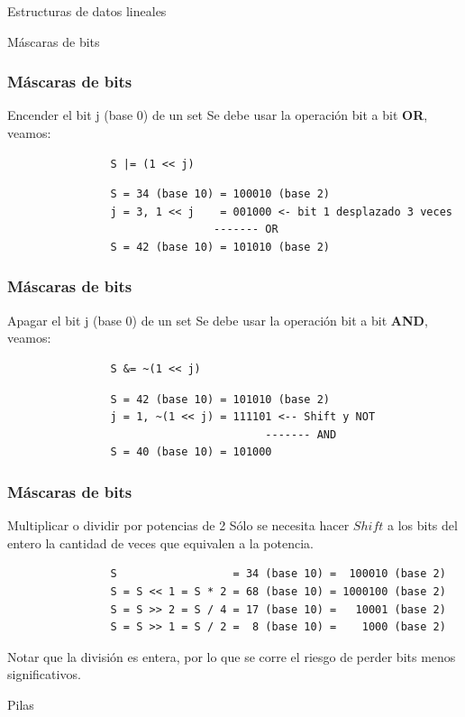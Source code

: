\documentclass{beamer}
\begin{document}
\begin{section}{Estructuras de datos lineales}
\begin{subsection}{Máscaras de bits}
	\begin{frame}[fragile]
		\frametitle{Máscaras de bits}
		\begin{block}{Encender el bit j (base 0) de un set}
			Se debe usar la operación bit a bit \textbf{OR}, veamos:
			\begin{verbatim}
				S |= (1 << j)
			\end{verbatim}
			\begin{lstlisting}
				S = 34 (base 10) = 100010 (base 2)
				j = 3, 1 << j    = 001000 <- bit 1 desplazado 3 veces
                  				------- OR
				S = 42 (base 10) = 101010 (base 2)	
			\end{lstlisting}
		\end{block}		
	\end{frame}
	
	\begin{frame}[fragile]
		\frametitle{Máscaras de bits}
		\begin{block}{Apagar el bit j (base 0) de un set}
			Se debe usar la operación bit a bit \textbf{AND}, veamos:
			\begin{verbatim}
				S &= ~(1 << j)
			\end{verbatim}
			\begin{lstlisting}
				S = 42 (base 10) = 101010 (base 2)
				j = 1, ~(1 << j) = 111101 <-- Shift y NOT
                  						------- AND
				S = 40 (base 10) = 101000	
			\end{lstlisting}	
		\end{block}		
	\end{frame}
	
	\begin{frame}[fragile]
		\frametitle{Máscaras de bits}
		\begin{block}{Multiplicar o dividir por potencias de 2}
			Sólo se necesita hacer $Shift$ a los bits del entero la cantidad de veces que equivalen a la potencia.
			\begin{lstlisting}
				S                  = 34 (base 10) =  100010 (base 2)
				S = S << 1 = S * 2 = 68 (base 10) = 1000100 (base 2)
				S = S >> 2 = S / 4 = 17 (base 10) =   10001 (base 2)
				S = S >> 1 = S / 2 =  8 (base 10) =    1000 (base 2)
			\end{lstlisting}	
			Notar que la división es entera, por lo que se corre el riesgo de perder bits menos significativos.	
		\end{block}		
	\end{frame}
	
\end{subsection}
\begin{subsection}{Pilas}


\end{subsection}
\end{section}
\end{document}
